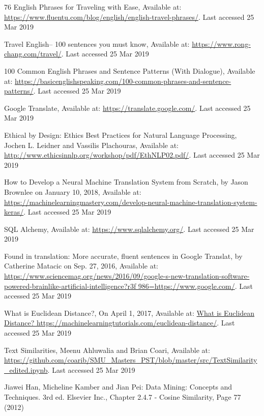 \documentclass[runningheads]{llncs}
\begin{document}
\begin{thebibliography}{8}
	76 English Phrases for Traveling with Ease, Available at: \url{https://www.fluentu.com/blog/english/english-travel-phrases/}.  Last accessed 25 Mar 2019

	Travel English-- 100 sentences you must know, Available at: \url{https://www.rong-chang.com/travel/}.  Last accessed 25 Mar 2019

	100 Common English Phrases and Sentence Patterns (With Dialogue), Available at: \url{https://basicenglishspeaking.com/100-common-phrases-and-sentence-patterns/}.  Last accessed 25 Mar 2019

	Google Translate, Available at: \url{https://translate.google.com/}.  Last accessed 25 Mar 2019

	Ethical by Design: Ethics Best Practices for Natural Language Processing, Jochen L. Leidner and Vassilis Plachouras, Available at: \url{http://www.ethicsinnlp.org/workshop/pdf/EthNLP02.pdf/}.  Last accessed 25 Mar 2019

How to Develop a Neural Machine Translation System from Scratch, by Jason Brownlee on January 10, 2018, Available at: \url{https://machinelearningmastery.com/develop-neural-machine-translation-system-keras/}.  Last accessed 25 Mar 2019

SQL Alchemy, Available at: \url{https://www.sqlalchemy.org/}.  Last accessed 25 Mar 2019

Found in translation: More accurate, fluent sentences in Google Translat, by Catherine Matacic on Sep. 27, 2016,  Available at:  \url{https://www.sciencemag.org/news/2016/09/google-s-new-translation-software-powered-brainlike-artificial-intelligence?r3f 986=https://www.google.com/}.  Last accessed 25 Mar 2019

What is Euclidean Distance?, On April 1, 2017, Available at:  \url{What is Euclidean Distance?  https://machinelearningtutorials.com/euclidean-distance/}.  Last accessed 25 Mar 2019

Text Similarities, Meenu Ahluwalia and Brian Coari, Available at:  \url{https://github.com/coarib/SMU_Masters_PST/blob/master/src/TextSimilarity_edited.ipynb}.  Last accessed 25 Mar 2019

Jiawei Han, Micheline Kamber and Jian Pei: Data Mining: Concepts and Techniques. 3rd ed. Elsevier Inc., Chapter 2.4.7 - Cosine Similarity, Page 77 (2012)


\end{thebibliography}
\end{document}
